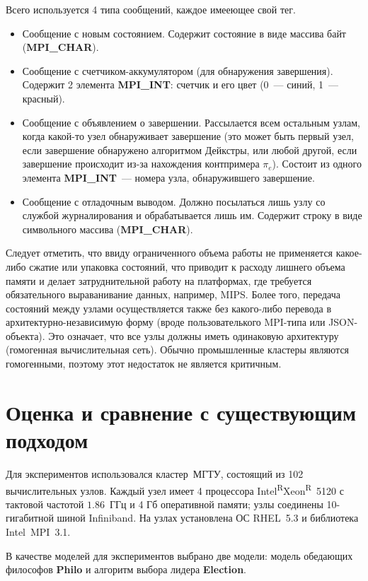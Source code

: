 \documentclass[12pt,a4paper,fleqn]{article}
\newcommand\regsign{\textsuperscript{\textcircled{\scriptsize{R}}}}
\newcommand{\Code}[1]{\textbf{\mbox{#1}}}
\begin{document}
Всего используется 4 типа сообщений, каждое имееющее свой тег.
\begin{itemize}
\item Сообщение с новым состоянием. Содержит состояние в виде массива байт
  (\Code{MPI\_CHAR}).
\item Сообщение с счетчиком-аккумулятором (для обнаружения завершения). Содержит 2 элемента
  \Code{MPI\_INT}: счетчик и его цвет (0~--- синий, 1~--- красный).
\item Сообщение с объявлением о завершении. Рассылается всем остальным узлам, когда какой-то узел
  обнаруживает завершение (это может быть первый узел, если завершение обнаружено алгоритмом
  Дейкстры, или любой другой, если завершение происходит из-за нахождения контпримера
  $\pi_e$). Состоит из одного элемента \Code{MPI\_INT}~--- номера узла, обнаружившего завершение.
\item Сообщение с отладочным выводом. Должно посылаться лишь узлу со службой журналирования и
  обрабатывается лишь им. Содержит строку в виде символьного массива (\Code{MPI\_CHAR}).
\end{itemize}

Следует отметить, что ввиду ограниченного объема работы не применяется какое-либо сжатие или
упаковка состояний, что приводит к расходу лишнего объема памяти и делает затруднительной работу на
платформах, где требуется обязательного выраванивание данных, например, MIPS. Более того, передача
состояний между узлами осуществляется также без какого-либо перевода в архитектурно-независимую
форму (вроде пользователького MPI-типа или JSON-объекта). Это означает, что все узлы должны иметь
одинаковую архитектуру (гомогенная вычислительная сеть). Обычно промышленные кластеры являются
гомогенными, поэтому этот недостаток не является критичным.

\section{Оценка и сравнение с существующим подходом}

Для экспериментов использовался кластер~МГТУ, состоящий из 102 вычислительных
узлов. Каждый узел имеет 4 процессора Intel\regsign Xeon\regsign~5120 с тактовой частотой
$1.86$~ГГц и 4 Гб оперативной памяти; узлы соединены 10-гигабитной шиной Infiniband. На
узлах установлена ОС RHEL~5.3 и библиотека Intel~MPI~3.1.

В качестве моделей для экспериментов выбрано две модели: модель обедающих философов
\Code{Philo} и алгоритм выбора лидера \Code{Election}.
\end{document}
